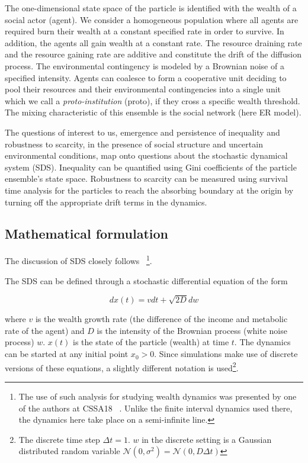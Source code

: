 \documentclass[sigconf]{acmart}
\begin{document}
The one-dimensional state space of the particle is identified with the wealth of a social actor (agent). We consider a homogeneous population where all agents are required burn their wealth at a constant specified rate in order to survive. In addition, the agents all gain wealth at a constant rate. The resource draining rate and the resource gaining rate are additive and constitute the drift of the diffusion process. The environmental contingency is modeled by a Brownian noise of a specified intensity. Agents can coalesce to form a cooperative unit deciding to pool their resources and their environmental contingencies into a single unit which we call a \textit{proto-institution} (proto), if they cross a specific wealth threshold. The mixing characteristic of this ensemble is the social network (here ER model).          

The questions of interest to us, emergence and persistence of inequality and robustness to scarcity, in the presence of social structure and uncertain environmental conditions, map onto questions about the stochastic dynamical system (SDS). Inequality can be quantified using Gini coefficients of the particle ensemble's state space. Robustness to scarcity can be measured using survival time analysis for the particles to reach the absorbing boundary at the origin by turning off the appropriate drift terms in the dynamics. 

\subsection{Mathematical formulation}
The discussion of SDS closely follows ~\cite{redner2001guide}\footnote{The use of such analysis for studying wealth dynamics was presented by one of the authors at CSSA18 ~\cite{rv}. Unlike the finite interval dynamics used there, the dynamics here take place on a semi-infinite line.}.

The SDS can be defined through a stochastic differential equation of the form 

\begin{equation}\label{ddm}
dx(t) = vdt + \sqrt{2D} dw
\end{equation}

\noindent where $v$ is the wealth growth rate (the difference of the income and metabolic rate of the agent) and $D$ is the intensity of the Brownian process (white noise process) $w$. $x(t)$ is the state of the particle (wealth) at time $t$. The dynamics can be started at any initial point $x_0 > 0$. Since simulations make use of discrete versions of these equations, a slightly different notation is used\footnote{The discrete time step $\Delta t=1$. $w$ in the discrete setting is a Gaussian distributed random variable $\mathcal{N}(0,\sigma^2) = \mathcal{N}(0,D\Delta t)$ }.
\end{document}
